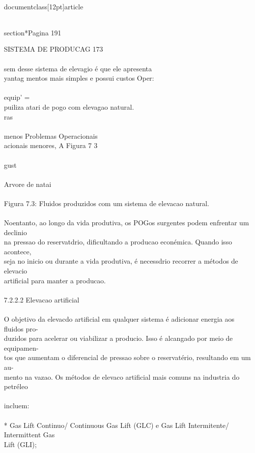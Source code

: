 \\documentclass[12pt]{article}
\begin{document}
\\section*{Pagina 191}

SISTEMA DE PRODUCAG 173\\
\\
sem desse sistema de elevagio é que ele apresenta\\
yantag mentos mais simples e possui custos Oper:\\
\\
equip’ =\\
puiliza atari de pogo com elevagao natural.\\
ras\\
\\
menos Problemas Operacionais\\
acionais menores, A Figura 7 3\\
\\
gust\\
\\
Arvore de natai\\
\\
Figura 7.3: Fluidos produzidos com um sistema de elevacao natural.\\
\\
Noentanto, ao longo da vida produtiva, os POGos surgentes podem enfrentar um declinio\\
na pressao do reservatdrio, dificultando a producao econémica. Quando isso acontece,\\
seja no inicio ou durante a vida produtiva, é necessdrio recorrer a métodos de elevacio\\
artificial para manter a producao.\\
\\
7.2.2.2 Elevacao artificial\\
\\
O objetivo da elevacdo artificial em qualquer sistema é adicionar energia aos fluidos pro-\\
duzidos para acelerar ou viabilizar a producio. Isso é alcangado por meio de equipamen-\\
tos que aumentam o diferencial de pressao sobre o reservatério, resultando em um au-\\
mento na vazao. Os métodos de elevaco artificial mais comuns na industria do petréleo\\
\\
incluem:\\
\\
* Gas Lift Continuo/ Continuous Gas Lift (GLC) e Gas Lift Intermitente/ Intermittent Gas\\
Lift (GLI);\\
\end{document}
